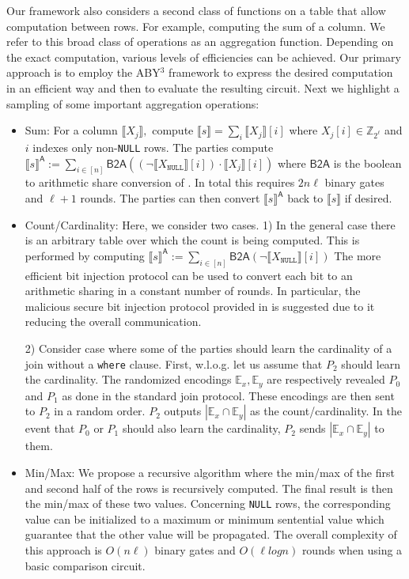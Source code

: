 \documentclass[11pt,letterpaper]{article}
\newcommand{\Party}[1]{\ensuremath{P_{#1}}\xspace}
\newcommand{\share}[1]{\ensuremath{\llbracket #1\rrbracket}\xspace}
\newcommand{\shareA}[1]{\ensuremath{\llbracket #1\rrbracket}^{\textsf{A}}\xspace}
\newcommand{\Null}{\texttt{NULL}\xspace}
\newcommand{\XNull}{\ensuremath{X_\Null}\xspace}
\begin{document}
Our framework also considers a second class of functions on a table that allow computation between rows. For example, computing the sum of a column. We refer to this broad class of operations as an aggregation function. Depending on the exact computation, various levels of efficiencies can be achieved. Our primary approach is to employ the ABY$^3$ framework \cite{aby3} to express the desired computation in an efficient way and then to evaluate the resulting circuit. Next we highlight a sampling of some important aggregation operations:
\begin{itemize}
	\item Sum: For a column $\share{X_j},$ compute $\share{s}=\sum_i \share{X_j}[i]$ where $X_j[i]\in \mathbb{Z}_{2^\ell}$ and $i$ indexes only non-\Null rows. The parties compute $\shareA{s}:=\sum_{i\in [n]}\textsf{B2A}((\neg\share{\XNull}[i]) \cdot \share{X_j}[i])$ where $\textsf{B2A}$ is the boolean to arithmetic share conversion of \cite{aby3}. In total this requires $2n\ell$ binary gates and $\ell+1$ rounds\cite{aby3}. The parties can then convert $\shareA{s}$ back to \share{s} if desired. 
	\item Count/Cardinality: Here, we consider two cases. 1) In the general case there is an arbitrary table over which the count is being computed. This is performed by computing $\shareA{s}:=\sum_{i\in [n]}\textsf{B2A}(\neg\share{\XNull}[i])$ 
	\iffullversion 
	The more efficient bit injection protocol\cite{aby3} can be used to convert each bit to an arithmetic sharing in a constant number of rounds. In particular, the malicious secure bit injection protocol provided in \cite{aby3} is suggested due to it reducing the overall communication. 
	\fi
	
	2) Consider case where some of the parties should learn the cardinality of a join without a \texttt{where} clause. First, w.l.o.g. let us assume that \Party{2} should learn the cardinality. The randomized encodings $\mathbb{E}_x,\mathbb{E}_y$ are respectively revealed \Party{0} and \Party{1}  as done in the standard join protocol. These encodings are then sent to \Party{2} in a random order. \Party{2} outputs $|\mathbb{E}_x \cap \mathbb{E}_y|$ as the count/cardinality. In the event that \Party{0} or \Party{1} should also learn the cardinality, \Party{2} sends $|\mathbb{E}_x \cap \mathbb{E}_y|$ to them.
	
	\item  Min/Max: We propose a recursive algorithm where the min/max of the first and second half of the rows is recursively computed. The final result is then the min/max of these two values.  Concerning \texttt{NULL} rows, the corresponding value can be initialized to a maximum or minimum sentential value which guarantee that the other value will be propagated. The overall complexity of this approach is $O(n\ell)$ binary gates and $O(\ell log n)$ rounds when using a basic comparison circuit\cite{aby3}.
\end{itemize}
\end{document}
